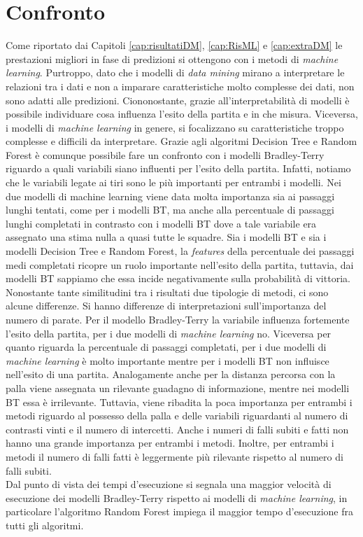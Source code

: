 \section{Confronto}
Come riportato dai Capitoli \ref{cap:risultatiDM}, \ref{cap:RisML} e  \ref{cap:extraDM} le prestazioni migliori in fase di predizioni si ottengono con i metodi di \emph{machine learning}. Purtroppo, dato che i modelli di \emph{data mining} mirano a interpretare le relazioni tra i dati e non a imparare caratteristiche molto complesse dei dati, non sono adatti alle predizioni. Ciononostante, grazie all'interpretabilità di modelli è possibile individuare cosa influenza l'esito della partita e in che misura. Viceversa, i modelli di \emph{machine learning} in genere, si focalizzano su caratteristiche troppo complesse e difficili da interpretare. Grazie agli algoritmi Decision Tree e Random Forest è comunque possibile fare un confronto con i modelli Bradley-Terry riguardo a quali variabili siano influenti per l'esito della partita.
Infatti, notiamo che le variabili legate ai tiri sono le più importanti per entrambi i modelli. Nei due modelli di machine learning viene data molta importanza sia ai passaggi lunghi tentati, come per i modelli BT, ma anche alla percentuale di passaggi lunghi completati in contrasto con i modelli BT dove a tale variabile era assegnato una stima nulla a quasi tutte le squadre. 
Sia i modelli BT e sia i modelli Decision Tree e Random Forest, la \emph{features} della percentuale dei passaggi medi completati ricopre un ruolo importante nell'esito della partita, tuttavia, dai modelli BT sappiamo che essa incide negativamente sulla probabilità di vittoria.
Nonostante tante similitudini tra i risultati due tipologie di metodi, ci sono alcune differenze. Si hanno differenze di interpretazioni sull'importanza del numero di parate. Per il modello Bradley-Terry la variabile influenza fortemente l'esito della partita, per i due modelli di \emph{machine learning} no. Viceversa per quanto riguarda la percentuale di passaggi completati, per i due modelli di \emph{machine learning} è molto importante mentre per i modelli BT non influisce nell'esito di una partita. Analogamente anche per la distanza percorsa con la palla viene assegnata un rilevante guadagno di informazione, mentre nei modelli BT essa è irrilevante. Tuttavia, viene ribadita la poca importanza per entrambi i metodi riguardo al possesso della palla e delle variabili riguardanti al numero di contrasti vinti e il numero di intercetti. Anche i numeri di falli subiti e fatti non hanno una grande importanza per entrambi i metodi. Inoltre, per entrambi i metodi il numero di falli fatti è leggermente più rilevante rispetto al numero di falli subiti.\\
Dal punto di vista dei tempi d'esecuzione si segnala una maggior velocità di esecuzione dei modelli Bradley-Terry rispetto ai modelli di \emph{machine learning}, in particolare l'algoritmo Random Forest impiega il maggior tempo d'esecuzione fra tutti gli algoritmi.


